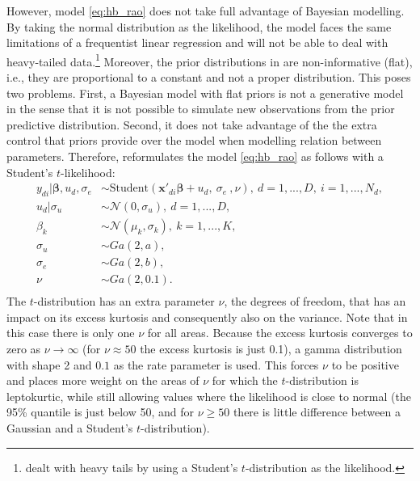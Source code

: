 However, model \ref{eq:hb_rao} does not take full advantage of Bayesian modelling.
By taking the normal distribution as the likelihood, the model faces the same limitations of a frequentist linear regression and will not be able to deal with heavy-tailed data.\footnote{\cite{morelli_hierarchical_2021} dealt with heavy tails by using a Student's $t$-distribution as the likelihood.}
Moreover, the prior distributions in \cite{molina_small_2014} are non-informative (flat), i.e., they are proportional to a constant and not a proper distribution.
This poses two problems.
First, a Bayesian model with flat priors is not a generative model in the sense that it is not possible to simulate new observations from the prior predictive distribution.
Second, it does not take advantage of the the extra control that priors provide over the model when modelling relation between parameters.
Therefore, \cite{morelli_hierarchical_2021} reformulates the model \ref{eq:hb_rao} as follows with a Student's $t$-likelihood:
\begin{equation}
	\begin{split}
		y_{di} |\boldsymbol \beta, u_d, \sigma_e & \sim
            \text{Student}(\boldsymbol{x'}_{di} \boldsymbol \beta + u_d,\ \sigma_e\ , \nu),\ d = 1, ..., D,\ i = 1, ..., N_d, \\
		u_d | \sigma_u & \sim \mathcal N(0, \sigma_u),\ d = 1, ..., D, \\
		\beta_k & \sim \mathcal N(\mu_k, \sigma_k),\ k = 1, ..., K,\\
		\sigma_u & \sim Ga(2, a), \\
		\sigma_e & \sim Ga(2, b), \\
		\nu & \sim Ga(2, 0.1). \\
	\end{split}
	\label{eq:mod_hb}
\end{equation}
The $t$-distribution has an extra parameter $\nu$, the degrees of freedom, that has an impact on its excess kurtosis and consequently also on the variance.
Note that in this case there is only one $\nu$ for all areas.
Because the excess kurtosis converges to zero as $\nu \rightarrow \infty$  (for $\nu \approx 50$ the excess kurtosis is just 0.1), a gamma distribution with shape 2 and $0.1$ as the rate parameter is used.
This forces $\nu$ to be positive and places more weight on the areas of $\nu$ for which the $t$-distribution is leptokurtic, while still allowing values where the likelihood is close to normal (the 95\% quantile is just below 50, and for $\nu \ge 50$ there is little difference between a Gaussian and a Student's $t$-distribution).
